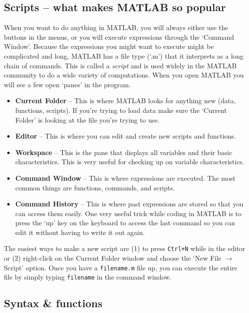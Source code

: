 \subsection{Scripts -- what makes MATLAB so popular}
When you want to do anything in MATLAB, you will always either use the buttons in the menus, or you will execute expressions through the `Command Window'. Because the expressions you might want to execute might be complicated and long, MATLAB has a file type (`.m') that it interprets as a long chain of commands. This is called a \emph{script} and is used widely in the MATLAB community to do a wide variety of computations.
When you open MATLAB you will see a few open `panes' in the program.
\begin{itemize}
\item{\bf Current Folder} -- This is where MATLAB looks for anything new (data, functions, scripts). If you're trying to load data make sure the `Current Folder' is looking at the file you're trying to use.
\item{\bf Editor} -- This is where you can edit and create new scripts and functions.
\item{\bf Workspace} -- This is the pane that displays all variables and their basic characteristics. This is very useful for checking up on variable characteristics.
\item{\bf Command Window} -- This is where expressions are executed. The most common things are functions, commands, and scripts.
\item{\bf Command History} -- This is where past expressions are stored so that you can access them easily. One very useful trick while coding in MATLAB is to press the `up' key on the keyboard to access the last command so you can edit it without having to write it out again.
\end{itemize}

The easiest ways to make a new script are (1) to press \texttt{Ctrl+N} while in the editor or (2) right-click on the Current Folder window and choose the `New File $\to$ Script' option. Once you have a \texttt{filename.m} file up, you can execute the entire file by simply typing \texttt{filename} in the command window.
\subsection{Syntax \& functions}

